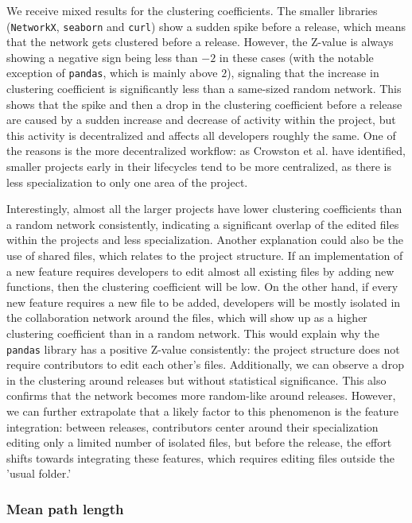 We receive mixed results for the clustering coefficients. The smaller libraries (\texttt{NetworkX}, \texttt{seaborn} and \texttt{curl}) show a sudden spike before a release, which means that the network gets clustered before a release. However, the Z-value is always showing a negative sign being less than $-2$ in these cases (with the notable exception of \texttt{pandas}, which is mainly above $2$), signaling that the increase in clustering coefficient is significantly less than a same-sized random network. This shows that the spike and then a drop in the clustering coefficient before a release are caused by a sudden increase and decrease of activity within the project, but this activity is decentralized and affects all developers roughly the same. One of the reasons is the more decentralized workflow: as Crowston et al. \cite{crowstonHierarchyCentralizationFree2006} have identified, smaller projects early in their lifecycles tend to be more centralized, as there is less specialization to only one area of the project.

Interestingly, almost all the larger projects have lower clustering coefficients than a random network consistently, indicating a significant overlap of the edited files within the projects and less specialization. Another explanation could also be the use of shared files, which relates to the project structure. If an implementation of a new feature requires developers to edit almost all existing files by adding new functions, then the clustering coefficient will be low. On the other hand, if every new feature requires a new file to be added, developers will be mostly isolated in the collaboration network around the files, which will show up as a higher clustering coefficient than in a random network. This would explain why the \texttt{pandas} library has a positive Z-value consistently: the project structure does not require contributors to edit each other's files. Additionally, we can observe a drop in the clustering around releases but without statistical significance. This also confirms that the network becomes more random-like around releases. However, we can further extrapolate that a likely factor to this phenomenon is the feature integration: between releases, contributors center around their specialization editing only a limited number of isolated files, but before the release, the effort shifts towards integrating these features, which requires editing files outside the 'usual folder.'

\subsubsection{Mean path length}

